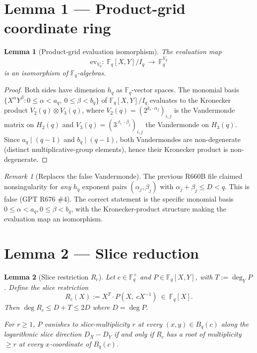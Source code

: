 \documentclass[12pt]{amsart}
\newtheorem{lemma}{Lemma}
\theoremstyle{definition}
\theoremstyle{remark}
\newtheorem{remark}{Remark}
\begin{document}
\section{Lemma 1 --- Product-grid coordinate ring}

\begin{lemma}[Product-grid evaluation isomorphism]\label{lem:1}
The evaluation map
$$
\mathrm{ev}_{V_q} :\ \mathbb{F}_q[X, Y] / I_q\ \longrightarrow\ \mathbb{F}_q^{V_q}
$$
is an isomorphism of $\mathbb{F}_q$-algebras.
\end{lemma}

\begin{proof}
Both sides have dimension $h_q$ as $\mathbb{F}_q$-vector spaces.
The monomial basis $\{X^\alpha Y^\beta : 0 \le \alpha < a_q,\ 0 \le \beta < b_q\}$
of $\mathbb{F}_q[X, Y] / I_q$ evaluates to the Kronecker product
$V_2(q) \otimes V_3(q)$, where $V_2(q) = (2^{k_i \cdot \alpha_j})_{i, j}$ is the
Vandermonde matrix on $H_2(q)$ and $V_3(q) = (3^{\ell_i \cdot \beta_j})_{i, j}$
the Vandermonde on $H_3(q)$. Since $a_q \mid (q - 1)$ and $b_q \mid (q - 1)$,
both Vandermondes are non-degenerate (distinct multiplicative-group elements),
hence their Kronecker product is non-degenerate.
\end{proof}

\begin{remark}[Replaces the false Vandermonde]
The previous R660B file claimed nonsingularity for \emph{any} $h_q$ exponent
pairs $(\alpha_j, \beta_j)$ with $\alpha_j + \beta_j \le D < q$. This is false
(GPT R676 \#4). The correct statement is the specific monomial basis
$0 \le \alpha < a_q, 0 \le \beta < b_q$, with the Kronecker-product structure
making the evaluation map an isomorphism.
\end{remark}

\section{Lemma 2 --- Slice reduction}

\begin{lemma}[Slice restriction $R_c$]\label{lem:2}
Let $c \in \mathbb{F}_q^\times$ and $P \in \mathbb{F}_q[X, Y]$, with
$T := \deg_Y P$. Define the \emph{slice restriction}
$$
R_c(X) := X^T \cdot P(X,\ c X^{-1})\ \in\ \mathbb{F}_q[X].
$$
Then $\deg R_c \le D + T \le 2 D$ where $D = \deg P$.

For $r \ge 1$, $P$ vanishes to slice-multiplicity $r$ at every $(x, y) \in B_q(c)$
along the logarithmic slice direction $D_X - D_Y$ if and only if $R_c$ has
a root of multiplicity $\ge r$ at every $x$-coordinate of $B_q(c)$.
\end{lemma}
\end{document}
